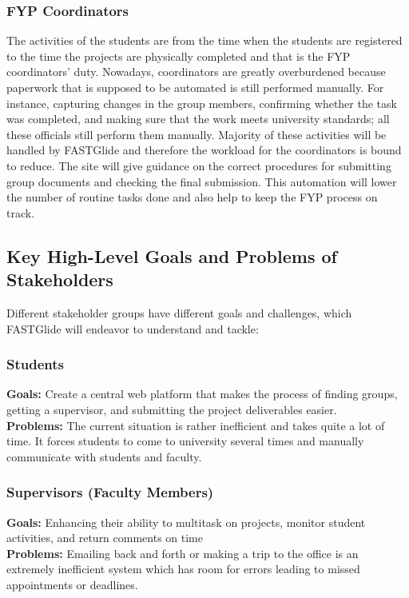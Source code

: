 \documentclass{FastFyp}
\begin{document}
\subsubsection{FYP Coordinators} 
The activities of the students are from the time when the students are registered to the time the projects are physically completed and that is the FYP coordinators’ duty. Nowadays, coordinators are greatly overburdened because paperwork that is supposed to be automated is still performed manually. For instance, capturing changes in the group members, confirming whether the task was completed, and making sure that the work meets university standards; all these officials still perform them manually. Majority of these activities will be handled by FASTGlide and therefore the workload for the coordinators is bound to reduce. The site will give guidance on the correct procedures for submitting group documents and checking the final submission. This automation will lower the number of routine tasks done and also help to keep the FYP process on track.
\subsection{Key High-Level Goals and Problems of Stakeholders}
Different stakeholder groups have different goals and challenges, which FASTGlide will endeavor to understand and tackle:

\subsubsection{Students}
\textbf{Goals:} Create a central web platform that makes the process of finding groups, getting a supervisor, and submitting the project deliverables easier.
\\
\textbf{Problems:} The current situation is rather inefficient and takes quite a lot of time. It forces students to come to university several times and manually communicate with students and faculty.

\subsubsection{Supervisors (Faculty Members)}
\textbf{Goals:} Enhancing their ability to multitask on projects, monitor student activities, and return comments on time
\\
\textbf{Problems:} Emailing back and forth or making a trip to the office is an extremely inefficient system which has room for errors leading to missed appointments or deadlines.
\end{document}
